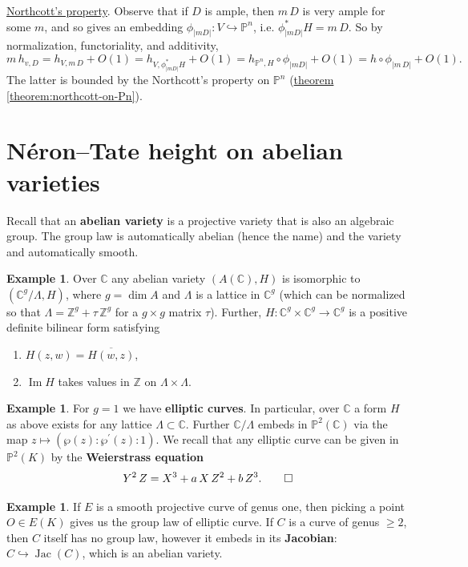\documentclass{article}
\newcommand{\refref}[2]{\hyperref[#2]{#1 \ref*{#2}}}
\theoremstyle{definition}
\newtheorem{example}[proposition]{Example}
\renewcommand{\Im}{\mathop{\mathrm{Im}}}
\DeclareMathOperator{\Jac}{Jac}
\newcommand{\term}{\textbf}
\newcommand{\ZZ}{\mathbb{Z}}
\newcommand{\CC}{\mathbb{C}}
\newcommand{\PP}{\mathbb{P}}
\begin{document}
\vspace{1em}

\noindent\underline{Northcott's property}. Observe that if $D$ is ample, then
$m\,D$ is very ample for some $m$, and so gives an embedding
$\phi_{|mD|}\colon V\hookrightarrow \PP^n$, i.e. $\phi_{|mD|}^* H = m\,D$. So by
normalization, functoriality, and additivity,
\[ m\,h_{v,D} = h_{V,m\,D} + O (1) =
  h_{V, \phi_{|mD|}^* H} + O (1) =
  h_{\PP^n, H} \circ \phi_{|mD|} + O (1) =
  h \circ \phi_{|m\,D|} + O (1). \]
The latter is bounded by the Northcott's property on $\PP^n$
(\refref{theorem}{theorem:northcott-on-Pn}).

\section{N\'eron--Tate height on abelian varieties}

Recall that an \term{abelian variety} is a projective variety that is also an
algebraic group. The group law is automatically abelian (hence the name) and the
variety and automatically smooth.

\begin{example}
  Over $\CC$ any abelian variety $(A (\CC), H)$ is isomorphic to
  $(\CC^g/\Lambda, H)$, where $g = \dim A$ and $\Lambda$ is a lattice in $\CC^g$
  (which can be normalized so that $\Lambda = \ZZ^g + \tau \, \ZZ^g$ for a
  $g\times g$ matrix $\tau$). Further, $H\colon \CC^g\times \CC^g\to \CC^g$ is a
  positive definite bilinear form satisfying

  \begin{enumerate}
  \item $H (z,w) = \overline{H (w,z)}$,
  \item $\Im H$ takes values in $\ZZ$ on $\Lambda\times\Lambda$. \qedhere
  \end{enumerate}
\end{example}

\begin{example}
  For $g = 1$ we have \term{elliptic curves}. In particular, over $\CC$ a form
  $H$ as above exists for any lattice $\Lambda \subset \CC$. Further
  $\CC/\Lambda$ embeds in $\PP^2 (\CC)$ via the map
  $z \mapsto (\wp (z) : \wp^\prime (z) : 1)$. We recall that any elliptic curve
  can be given in $\PP^2 (K)$ by the \term{Weierstrass equation}
  \[ Y^2\,Z = X^3 + a\,X\,Z^2 + b\,Z^3. \qedhere \]
\end{example}

\begin{example}
  If $E$ is a smooth projective curve of genus one, then picking a point
  $O \in E(K)$ gives us the group law of elliptic curve. If $C$ is a curve of
  genus $\ge 2$, then $C$ itself has no group law, however it embeds in its
  \term{Jacobian}: $C \hookrightarrow \Jac (C)$, which is an abelian variety.
\end{example}
\end{document}
